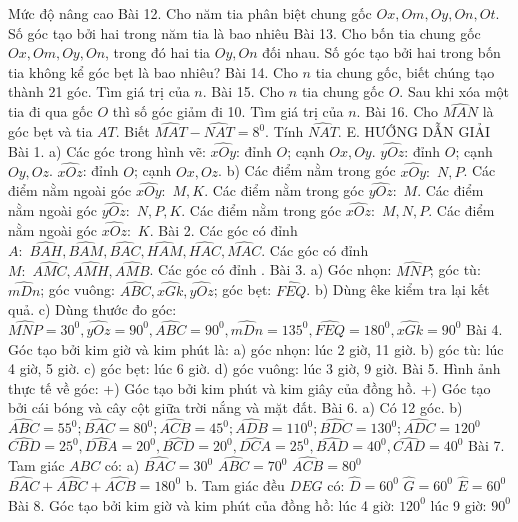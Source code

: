 Mức độ nâng cao
Bài 12. Cho năm tia phân biệt chung gốc $Ox,Om,Oy,On,Ot$. Số góc tạo bởi hai trong năm tia là bao nhiêu
Bài 13. Cho bốn tia chung gốc $Ox,Om,Oy,On$, trong đó hai tia $Oy,On$ đối nhau. Số góc tạo bởi hai trong bốn tia không kể góc bẹt là bao nhiêu?
Bài 14. Cho $n$ tia chung gốc, biết chúng tạo thành 21 góc. Tìm giá trị của $n$.
Bài 15. Cho $n$ tia chung gốc $O$. Sau khi xóa một tia đi qua gốc $O$ thì số góc giảm đi 10. Tìm giá trị của $n$.
Bài 16. Cho $\widehat{MAN}$ là góc bẹt và tia $AT$. Biết $\widehat{MAT}-\widehat{NAT}={{8}^{0}}$. Tính $\widehat{NAT}$.
E. HƯỚNG DẪN GIẢI
Bài 1. 
a) Các góc trong hình vẽ:
$\widehat{xOy}$: đỉnh $O$; cạnh $Ox,Oy$.
$\widehat{yOz}$: đỉnh $O$; cạnh $Oy,Oz$.
$\widehat{xOz}$: đỉnh $O$; cạnh $Ox,Oz$.
b) Các điểm nằm trong góc $\widehat{xOy}:\,\,N,P$.
Các điểm nằm ngoài góc $\widehat{xOy}:\,\,M,K$.
Các điểm nằm trong góc $\widehat{yOz}:\,\,M$.
Các điểm nằm ngoài góc $\widehat{yOz}:\,\,N,P,K$.
Các điểm nằm trong góc $\widehat{xOz}:\,\,M,N,P$.
Các điểm nằm ngoài góc $\widehat{xOz}:\,\,K$.
Bài 2. Các góc có đỉnh $A:\,\,\widehat{BAH},\widehat{BAM},\widehat{BAC},\widehat{HAM},\widehat{HAC},\widehat{MAC}$.
Các góc có đỉnh $M:\,\,\widehat{AMC},\widehat{AMH},\widehat{AMB}$.
Các góc có đỉnh .
Bài 3. 
a) Góc nhọn: $\widehat{MNP}$; góc tù: $\widehat{mDn}$; góc vuông: $\widehat{ABC},\widehat{xGk},\widehat{yOz}$; góc bẹt: $\widehat{FEQ}$.
b) Dùng êke kiểm tra lại kết quả.
c) Dùng thước đo góc: $\widehat{MNP}={{30}^{0}},\widehat{yOz}={{90}^{0}},\widehat{ABC}={{90}^{0}},\widehat{mDn}={{135}^{0}},\widehat{FEQ}={{180}^{0}},\widehat{xGk}={{90}^{0}}$
Bài 4. Góc tạo bởi kim giờ và kim phút là:
a) góc nhọn: lúc 2 giờ, 11 giờ.
b) góc tù: lúc 4 giờ, 5 giờ.
c) góc bẹt: lúc 6 giờ.
d) góc vuông: lúc 3 giờ, 9 giờ.
Bài 5. Hình ảnh thực tế về góc:
+) Góc tạo bởi kim phút và kim giây của đồng hồ.
+) Góc tạo bởi cái bóng và cây cột giữa trời nắng và mặt đất.
Bài 6. 
a) Có 12 góc.
b) $\widehat{ABC}={{55}^{0}};\widehat{BAC}={{80}^{0}};\widehat{ACB}={{45}^{0}};\widehat{ADB}={{110}^{0}};\widehat{BDC}={{130}^{0}};\widehat{ADC}={{120}^{0}}$
$\widehat{CBD}={{25}^{0}},\widehat{DBA}={{20}^{0}},\widehat{BCD}={{20}^{0}},\widehat{DCA}={{25}^{0}},\widehat{BAD}={{40}^{0}},\widehat{CAD}={{40}^{0}}$
Bài 7. Tam giác $ABC$ có:
a) $\widehat{BAC}={{30}^{0}}$
$\widehat{ABC}={{70}^{0}}$
$\widehat{ACB}={{80}^{0}}$
$\widehat{BAC}+\widehat{ABC}+\widehat{ACB}={{180}^{0}}$
b. Tam giác đều $DEG$ có:
$\widehat{D}={{60}^{0}}$
$\widehat{G}={{60}^{0}}$
$\widehat{E}={{60}^{0}}$
Bài 8. Góc tạo bởi kim giờ và kim phút của đồng hồ:
lúc 4 giờ: ${{120}^{0}}$
lúc 9 giờ: ${{90}^{0}}$
